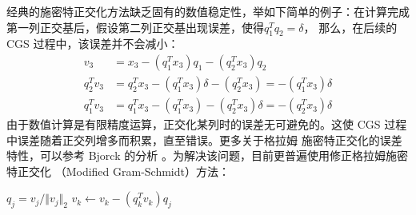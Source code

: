 经典的施密特正交化方法缺乏固有的数值稳定性，举如下简单的例子：在计算完成第一列正交基后，假设第二列正交基出现误差，使得$q_1^Tq_2=\delta$，
那么，在后续的 CGS 过程中，该误差并不会减小：
\begin{align*}
    v_3      & =x_3-(q_1^Tx_3)q_1-(q_2^Tx_3)q_2                         \\
    q_2^Tv_3 & =q_2^Tx_3-(q_1^Tx_3)\delta -(q_2^Tx_3)=-(q_1^Tx_3)\delta \\
    q_1^Tv_3 & =q_1^Tx_3-(q_1^Tx_3)-(q_2^Tx_3)\delta=-(q_2^Tx_3)\delta
\end{align*}
由于数值计算是有限精度运算，正交化某列时的误差无可避免的。这使 CGS 过程中误差随着正交列增多而积累，直至错误。更多关于格拉姆
施密特正交化的误差特性，可以参考 Bjorck 的分析 \cite{BJORCK1994297}。为解决该问题，目前更普遍使用修正格拉姆施密特正交化
（Modified Gram-Schmidt）方法：
\begin{center}
    \begin{minipage}{.7\linewidth}
        \begin{algorithm}[H]
            \caption{}
            {
                $q_j=v_j/\Vert v_j\Vert_2$\;
                {
                    $v_k\leftarrow v_k-(q_k^Tv_k)q_j$\;
                }
            }
        \end{algorithm}
    \end{minipage}
\end{center}

